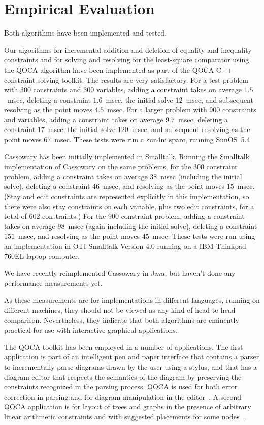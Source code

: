 \documentclass{article}
\begin{document}
\section{Empirical Evaluation}
\label{empirical-evaluation}

Both algorithms have been implemented and tested.

Our algorithms for incremental addition and deletion of equality and inequality
constraints and for solving and resolving for the least-square comparator
using the QOCA algorithm have been implemented as part of the QOCA C++
constraint solving toolkit. 
The results are very satisfactory.
For a test problem with 300 constraints and
300 variables, adding a constraint takes
on average  $1.5$~msec, deleting a constraint $1.6$~msec, the initial
solve  $12$~msec, and subsequent resolving as the point moves $4.5$~msec.
For a larger problem with 900 constraints and variables,
adding a constraint takes
on average  $9.7$~msec, deleting a constraint $17$~msec, the initial
solve  $120$~msec, and subsequent resolving as the point moves $67$~msec.
These tests were run a sun4m sparc, running SunOS~5.4.

Cassowary has been initially implemented in Smalltalk.
Running the Smalltalk implementation of Cassowary on the same problems, 
for the 300 constraint problem,
adding a constraint takes on average $38$~msec (including the initial
solve), deleting a constraint $46$~msec, and resolving as the point moves
$15$~msec.  (Stay and edit constraints are represented explicitly in this
implementation, so there were also stay constraints on each variable, plus
two edit constraints, for a total of 602 constraints.)
For the 900 constraint problem, adding a constraint takes on
average $98$~msec (again including the initial solve), deleting a
constraint $151$~msec, and resolving as the point moves $45$~msec.  These
tests were run using an implementation in OTI Smalltalk Version 4.0 running
on a IBM Thinkpad 760EL laptop computer.

We have recently reimplemented Cassowary in Java, but haven't
done any performance measurements yet.

As these measurements are for implementations in different languages,
running on different machines, they should not be viewed as any kind of
head-to-head comparison.  Nevertheless, they indicate that both
algorithms are eminently practical for use with interactive graphical
applications.

The QOCA toolkit has been employed in a number of applications.
The first application is part of an intelligent pen and paper
interface that contains a parser to incrementally parse diagrams drawn by
the user using a stylus, and that has a diagram editor that respects
the semantics of the diagram by preserving the constraints recognized
in the parsing process.  QOCA is used for both error correction in
parsing and for diagram manipulation in the editor~\cite{chok-marriott95}.
A second QOCA application is for layout of trees and graphs in the
presence of arbitrary linear arithmetic constraints and with
suggested placements for some nodes~\cite{he-marriott96}.
\end{document}

